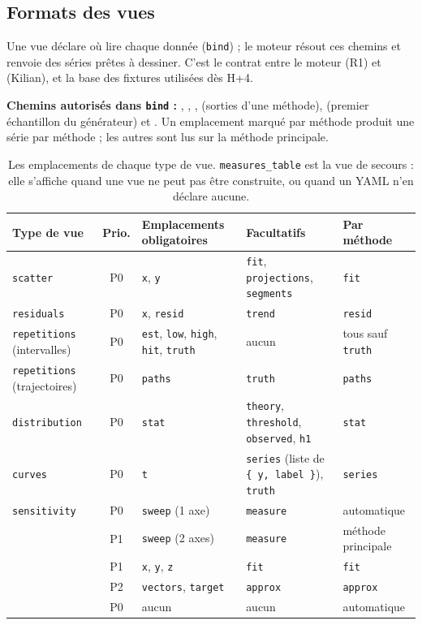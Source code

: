 \documentclass[11pt,a4paper]{article}
\begin{document}
\begin{appendices}
\newpage
\section{Formats des vues}\label{ann:vues}
Une vue déclare où lire chaque donnée (\texttt{bind}) ; le moteur résout ces chemins et renvoie des séries prêtes à dessiner. C'est le contrat entre le moteur (R1) et  (Kilian), et la base des fixtures utilisées dès H+4.

\textbf{Chemins autorisés dans \texttt{bind} :} , , ,  (sorties d'une méthode),  (premier échantillon du générateur) et . Un emplacement marqué \og par méthode \fg{} produit une série par méthode ; les autres sont lus sur la méthode principale.

\begin{table}[H]
  \centering
  \footnotesize
  \begin{tabularx}{\textwidth}{@{}L{2.6cm} c L{3.4cm} L{2.9cm} Y@{}}
    \toprule
    \textbf{Type de vue} & \textbf{Prio.} & \textbf{Emplacements obligatoires} & \textbf{Facultatifs} & \textbf{Par méthode} \\
    \midrule
    \texttt{scatter} & P0 & \texttt{x}, \texttt{y} & \texttt{fit}, \texttt{projections}, \texttt{segments} & \texttt{fit} \\
    \texttt{residuals} & P0 & \texttt{x}, \texttt{resid} & \texttt{trend} & \texttt{resid} \\
    \texttt{repetitions} (intervalles) & P0 & \texttt{est}, \texttt{low}, \texttt{high}, \texttt{hit}, \texttt{truth} & aucun & tous sauf \texttt{truth} \\
    \texttt{repetitions} (trajectoires) & P0 & \texttt{paths} & \texttt{truth} & \texttt{paths} \\
    \texttt{distribution} & P0 & \texttt{stat} & \texttt{theory}, \texttt{threshold}, \texttt{observed}, \texttt{h1} & \texttt{stat} \\
    \texttt{curves} & P0 & \texttt{t} & \texttt{series} (liste de \texttt{\{ y, label \}}), \texttt{truth} & \texttt{series} \\
    \texttt{sensitivity} & P0 & \texttt{sweep} (1 axe) & \texttt{measure} & automatique \\
     & P1 & \texttt{sweep} (2 axes) & \texttt{measure} & méthode principale \\
     & P1 & \texttt{x}, \texttt{y}, \texttt{z} & \texttt{fit} & \texttt{fit} \\
     & P2 & \texttt{vectors}, \texttt{target} & \texttt{approx} & \texttt{approx} \\
     & P0 & aucun & aucun & automatique \\
    \bottomrule
  \end{tabularx}
  \caption{Les emplacements de chaque type de vue. \texttt{measures\_table} est la vue de secours : elle s'affiche quand une vue ne peut pas être construite, ou quand un YAML n'en déclare aucune.}
\end{table}


\end{appendices}
\end{document}
